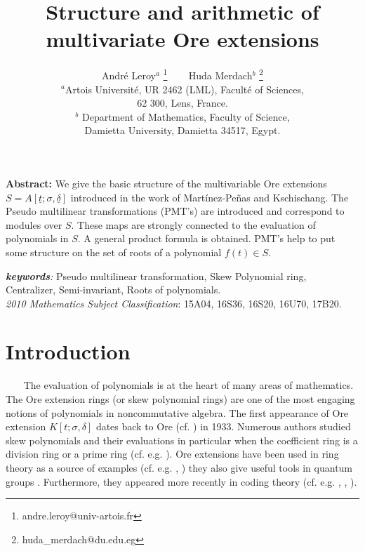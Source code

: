 \documentclass[12pt,a4paper]{article}
\newcommand{\si}{\sigma}
\newcommand{\ut}{\underline{t}}
\newcommand{\ud}{\underline{\delta}}
\begin{document}
	\title{\textbf{Structure and arithmetic of multivariate Ore extensions}}
	
	\author{Andr\'e Leroy$^{a}$ \thanks{andre.leroy@univ-artois.fr} ~~~ Huda Merdach$^{b}$ \thanks{huda\_merdach@du.edu.eg} \\
		$^{a}$Artois Universit\'e, UR 2462 (LML), Facult\'e of Sciences,\\ 62 300, Lens, France. 
		\\ $^{b}$ Department of Mathematics, Faculty of Science,\\
		Damietta University, Damietta 34517, Egypt.}
	\date{}
	\maketitle	

\textbf{Abstract:}  We give the basic structure of the multivariable Ore extensions $S=A[\ut; \sigma, \ud]$ introduced in the work of Mart\'i{n}ez-Pe\~nas and Kschischang. The Pseudo multilinear transformations (PMT's) are introduced and correspond to modules over $S$.  These maps are strongly connected to the evaluation of polynomials in $S$. A general product formula is obtained. PMT's help to put some structure on the set of roots  of a polynomial $f(t) \in S$. 
	
	\textit{\textbf{keywords}:}  Pseudo multilinear transformation, Skew Polynomial ring, Centralizer, Semi-invariant, Roots of polynomials.
	\\  
	\textit{2010 Mathematics Subject Classification}: 15A04, 16S36,  16S20, 16U70, 17B20.
	\section{Introduction}
	 
		~~~ The evaluation of polynomials is at the heart of many areas of mathematics. The Ore extension rings (or skew polynomial rings) are one of the most engaging  notions of polynomials in noncommutative algebra. The first appearance  of Ore extension $K[t; \si, \delta]$ dates back to Ore (cf. \cite{Or}) in 1933. Numerous authors studied skew polynomials and their evaluations in particular when the coefficient ring is a division ring or a prime ring (cf. e.g. \cite{L2012}).  Ore extensions have been used in ring theory as a source of examples (cf. e.g. \cite{CP 2003}, \cite{L2012}) they also give useful tools in quantum groups \cite{BG}. Furthermore, they appeared more recently in coding theory (cf. e.g. \cite{BL2013}, \cite{BU cod 2009}, \cite{BGU}).   
		
\end{document}
